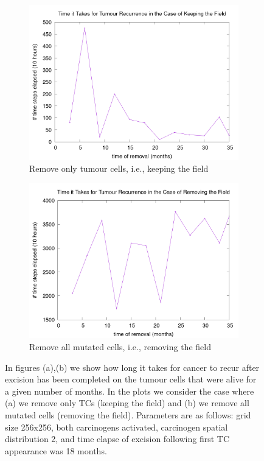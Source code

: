 \documentclass[\main/thesis.tex]{subfiles}
\begin{document}
\begin{figure}[H]
    \centering
    \begin{subfigure}[t]{.49\textwidth}
      \centering
      \includegraphics[width=\textwidth]{images/5_TumourExcisions/Fig2/timeToRecur_KeepField.png}
      \caption{Remove only tumour cells, i.e., keeping the field}
      \label{fig:TumourExcision_timeToRecur_Keep}
    \end{subfigure}
    \begin{subfigure}[t]{.49\textwidth}
      \centering
      \includegraphics[width=\textwidth]{images/5_TumourExcisions/Fig2/timeToRecur_RemoveField.png}
      \caption{Remove all mutated cells, i.e., removing the field}
      \label{fig:TumourExcision_timeToRecur_Remove}
    \end{subfigure}
    \caption{In figures (a),(b) we show how long it takes for cancer to recur after excision has been completed on the tumour cells that were alive for a given number of months. In the plots we consider the case where (a) we remove only TCs (keeping the field) and (b) we remove all mutated cells (removing the field). Parameters are as follows: grid size 256x256, both carcinogens activated, carcinogen spatial distribution 2, and time elapse of excision following first TC appearance was 18 months.}
    \label{fig:TumourExcision_timeToRecur}
\end{figure}
\end{document}

